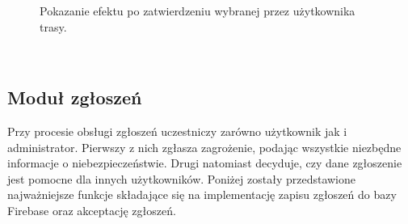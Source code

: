 \noindent
\setlength{\fboxrule}{0.5pt}
\begin{figure}[H]
    \centering
    \caption{Pokazanie efektu po zatwierdzeniu wybranej przez użytkownika trasy.}
    \label{widok:zatwierdztrasee}
\end{figure}
\\



\subsection{Moduł zgłoszeń}
Przy procesie obsługi zgłoszeń uczestniczy zarówno użytkownik jak i administrator. Pierwszy z nich zgłasza zagrożenie, podając wszystkie niezbędne informacje o niebezpieczeństwie. Drugi natomiast decyduje, czy dane zgłoszenie jest pomocne dla innych użytkowników.  Poniżej zostały przedstawione najważniejsze funkcje składające się na implementację zapisu zgłoszeń do bazy Firebase oraz akceptację zgłoszeń.
\\

